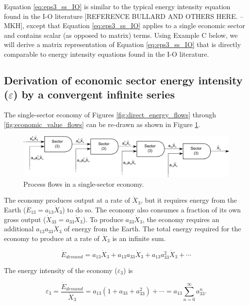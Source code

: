\documentclass[authoryear,preprint,review,12pt]{elsarticle}
\begin{document}
Equation \ref{eq:eps3_ss_IO} is similar to the typical energy intensity equation found in the I-O literature [REFERENCE BULLARD AND OTHERS HERE. --MKH], except that Equation \ref{eq:eps3_ss_IO} applies to a single economic sector and contains scalar (as opposed to matrix) terms. Using Example C below, we will derive a matrix representation of Equation \ref{eq:eps3_ss_IO} that is directly comparable to energy intensity equations found in the I-O literature.

\subsection{Derivation of economic sector energy intensity ($\varepsilon$) by a convergent infinite series}

The single-sector economy of Figures \ref{fig:direct_energy_flows} through \ref{fig:economic_value_flows} can be re-drawn as shown in Figure \ref{fig:single_sector_flows_3}.

\begin{figure}[h!]
\includegraphics[width=1.0\linewidth]{images/Heun_I-O_Process_Equivalence_3.pdf}
\caption{Process flows in a single-sector economy.}
\label{fig:single_sector_flows_3}
\end{figure}

The economy produces output at a rate of $\dot{X}_{3}$, but it requires energy from the Earth ($\dot{E}_{13} = a_{13}\dot{X}_{3}$) to do so. The economy also consumes a fraction of its own gross output ($\dot{X}_{33} = a_{33}\dot{X}_{3}$). To produce $a_{33}\dot{X}_{3}$, the economy requires an additional $a_{13}a_{33}\dot{X}_{3}$ of energy from the Earth. The total energy required for the economy to produce at a rate of $\dot{X}_{3}$ is an infinite sum.

\begin{equation} \label{eq:E_dot_demand_SS}
	\dot{E}_{demand} = a_{13}\dot{X}_{3} + a_{13}a_{33}\dot{X}_{3} + a_{13}a_{33}^2\dot{X}_{3} + \cdots
\end{equation}

The energy intensity of the economy ($\varepsilon_{3}$) is 

\begin{equation} \label{eq:epsilon_process_SS_intermediate}
	\varepsilon_{3} = \frac{\dot{E}_{demand}}{\dot{X}_{3}} = a_{13}(1 + a_{33} + a_{33}^2) + \cdots = a_{13}\sum_{n=0}^{\infty}a_{33}^{n}.
\end{equation}
\end{document}
